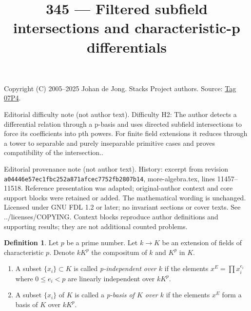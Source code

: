\documentclass{amsart}
\theoremstyle{plain}
\theoremstyle{definition}
\newtheorem{definition}[subsection]{Definition}
\theoremstyle{remark}
\numberwithin{equation}{subsection}
\begin{document}
\title[Stacks Project, Tag 07P4]{345 --- Filtered subfield intersections and characteristic-p differentials}
\maketitle
\noindent Copyright (C) 2005--2025 Johan de Jong. Stacks Project authors. Source: \href{https://stacks.math.columbia.edu/tag/07P4}{Tag 07P4}.

\noindent Editorial difficulty note (not author text). Difficulty H2: The author detects a differential relation through a p-basis and uses directed subfield intersections to force its coefficients into pth powers. For finite field extensions it reduces through a tower to separable and purely inseparable primitive cases and proves compatibility of the intersection..

\noindent Editorial provenance note (not author text). History: excerpt from revision \texttt{a0444\allowbreak 6e57e\allowbreak c1fbc\allowbreak 252a8\allowbreak 71afc\allowbreak ec775\allowbreak 2fb28\allowbreak 07b14}, more-algebra.tex, lines 11457--11518. Reference presentation was adapted; original-author context and core support blocks were retained or added. The mathematical wording is unchanged. Licensed under GNU FDL 1.2 or later; no invariant sections or cover texts. See ../licenses/COPYING. Context blocks reproduce author definitions and supporting results; they are not additional counted problems.

\begin{definition}
\label{definition-p-basis}
Let $p$ be a prime number. Let $k \to K$ be an extension of fields
of characteristic $p$. Denote $kK^p$ the compositum of $k$ and $K^p$
in $K$.
\begin{enumerate}
\item A subset $\{x_i\} \subset K$ is called {\it p-independent
over $k$} if the elements $x^E = \prod x_i^{e_i}$ where
$0 \leq e_i < p$ are linearly independent over $kK^p$.
\item A subset $\{x_i\}$ of $K$ is called a
{\it p-basis of $K$ over $k$} if the elements
$x^E$ form a basis of $K$ over $kK^p$.
\end{enumerate}
\end{definition}
\end{document}
